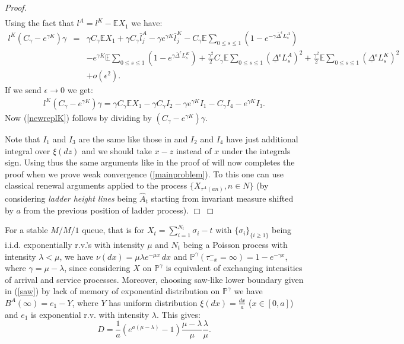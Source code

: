 \documentclass{aptpub}
\begin{document}
\begin{proof}
\begin{eqnarray*}
\end{eqnarray*}
Using the fact that $l^A=l^K-\mathbb{E}X_1$ we have:
\begin{eqnarray*}
l^K(C_\gamma-e^{\gamma K})\gamma&=&\gamma C_\gamma\mathbb{E}X_1+\gamma C_\gamma \overline{l}_j^A-\gamma e^{\gamma K}\overline{l}_j^K-C_\gamma\mathbb{E}\sum_{0\leq s\leq 1}(1-e^{-\gamma\overline{\Delta}^\epsilon L_s^A})\\
&&-e^{\gamma K}\mathbb{E}\sum_{0\leq s\leq 1}(1-e^{\gamma\overline{\Delta}^\epsilon L_s^K})+\frac{\gamma^2}{2}C_\gamma\mathbb{E}\sum_{0\leq s\leq 1}(\underline{\Delta}^\epsilon L_s^A)^2+\frac{\gamma^2}{2}\mathbb{E}\sum_{0\leq s\leq 1}(\underline{\Delta}^\epsilon L_s^K)^2\\ &&+o(\epsilon^2).
\end{eqnarray*}
If we send $\epsilon\to 0$ we get:
\begin{eqnarray*}
l^K(C_\gamma-e^{\gamma K})\gamma=\gamma C_\gamma\mathbb{E}X_1-\gamma C_\gamma I_2-\gamma e^{\gamma K}I_1-C_\gamma I_4-e^{\gamma K}I_3.
\end{eqnarray*}
Now (\ref{newreplK}) follows by dividing by $(C_\gamma-e^{\gamma K})\gamma$.

Note that $I_1$ and $I_3$ are the same like those in \cite[Theorem 3.2]{AP} and $I_2$ and $I_4$ have just additional integral over $\xi(dz)$ and
we should take $x-z$ instead of $x$ under the integrals sign. Using thus the same arguments like in the proof of \cite[Theorem 4.1]{AP} will now completes the proof
when we prove weak convergence (\ref{mainproblem}). To this one can use classical renewal arguments applied to the process $\{X_{\tau^A(an)},n\in N\}$
(by considering {\it ladder height lines} being $\widehat{A}_t$ starting from invariant measure shifted by $a$ from the previous position of ladder process).
{\newline\vspace{3mm}\hfill $\Box$}\end{proof}

\begin{ex}
For a stable $M/M/1$ queue, that is for $X_t=\sum_{i=1}^{N_t}\sigma_i-t$ with $\{\sigma_i\}_{\{i\geq 1\}}$ being i.i.d. exponentially r.v.'s with intensity $\mu$ and $N_t$ being a Poisson process
with intensity $\lambda<\mu$, we have $\nu(dx)=\mu\lambda e^{-\mu x}\,dx$ and $\mathbb{P}^\gamma(\tau_{-x}^-=\infty)=1-e^{-\gamma x}$, where $\gamma=\mu-\lambda$,
since considering $X$ on $\mathbb{P}^\gamma$ is equivalent of exchanging intensities of arrival and service processes.
Moreover, choosing saw-like lower boundary given in (\ref{saw}) by lack of memory of exponential distribution on $\mathbb{P}^\gamma$ we have $B^A(\infty)=e_1-Y$, where $Y$ has uniform
distribution $\xi(dx)=\frac{dx}{a}$ ($x\in [0,a]$) and $e_1$ is exponential r.v. with intensity $\lambda$.
This gives:
$$D=\frac{1}{a}\left(e^{a(\mu-\lambda)}-1\right)\frac{\mu-\lambda}{\mu}\frac{\lambda}{\mu}.$$
\end{ex}
\end{document}
